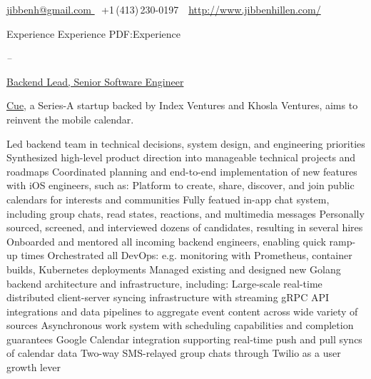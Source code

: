 \documentclass[letterpaper,nonstopmode]{simpleresumecv}
\newcommand{\CVAuthor}{Jibben Hillen}
\newcommand{\CVWebpage}{http://www.jibbenhillen.com/}
\begin{document}

\Title{\CVAuthor}

\begin{SubTitle}
\href{mailto:jibbenh@gmail.com}
{jibbenh@gmail.com }
\,\SubBulletSymbol\,
+1\,(413)\,230-0197
\,\SubBulletSymbol\,
\href{\CVWebpage}
{\url{\CVWebpage}}
\end{SubTitle}

\begin{Body}
\thispagestyle{empty}


\Section
{Experience}
{Experience}
{PDF:Experience}

\Entry
{}
\hfill \textit{ -- }
\SmallGap
\begin{Position}\underline{Backend Lead, Senior Software Engineer}\end{Position}
\Gap
\begin{Detail} \href{https://www.cue.app}{Cue}, a Series-A startup backed by Index Ventures and Khosla Ventures, aims to reinvent the mobile calendar.
\end{Detail}
\SmallGap
\BulletItem Led backend team in technical decisions, system design, and engineering priorities
\BulletItem Synthesized high-level product direction into manageable technical projects and roadmaps
\BulletItem Coordinated planning and end-to-end implementation of new features with iOS engineers, such as:
\SubBulletItem Platform to create, share, discover, and join public calendars for interests and communities
\SubBulletItem Fully featued in-app chat system, including group chats, read states, reactions, and multimedia messages
\BulletItem Personally sourced, screened, and interviewed dozens of candidates, resulting in several hires
\BulletItem Onboarded and mentored all incoming backend engineers, enabling quick ramp-up times
\BulletItem Orchestrated all DevOps: e.g. monitoring with Prometheus, container builds, Kubernetes deployments
\BulletItem Managed existing and designed new Golang backend architecture and infrastructure, including:
\SubBulletItem Large-scale real-time distributed client-server syncing infrastructure with streaming gRPC
\SubBulletItem API integrations and data pipelines to aggregate event content across wide variety of sources
\SubBulletItem Asynchronous work system with scheduling capabilities and completion guarantees
\SubBulletItem Google Calendar integration supporting real-time push and pull syncs of calendar data
\SubBulletItem Two-way SMS-relayed group chats through Twilio as a user growth lever
\BigGap


\end{Body}
\end{document}
